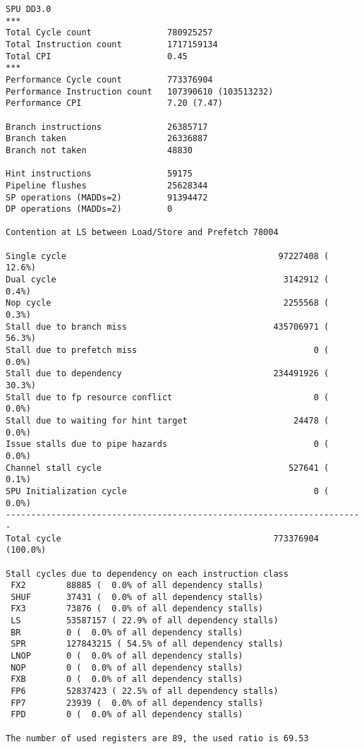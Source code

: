 \scriptsize
\begin{verbatim}
SPU DD3.0
***
Total Cycle count               780925257
Total Instruction count         1717159134
Total CPI                       0.45
***
Performance Cycle count         773376904
Performance Instruction count   107390610 (103513232)
Performance CPI                 7.20 (7.47)

Branch instructions             26385717
Branch taken                    26336887
Branch not taken                48830

Hint instructions               59175
Pipeline flushes                25628344
SP operations (MADDs=2)         91394472
DP operations (MADDs=2)         0

Contention at LS between Load/Store and Prefetch 78004

Single cycle                                          97227408 ( 12.6%)
Dual cycle                                             3142912 (  0.4%)
Nop cycle                                              2255568 (  0.3%)
Stall due to branch miss                             435706971 ( 56.3%)
Stall due to prefetch miss                                   0 (  0.0%)
Stall due to dependency                              234491926 ( 30.3%)
Stall due to fp resource conflict                            0 (  0.0%)
Stall due to waiting for hint target                     24478 (  0.0%)
Issue stalls due to pipe hazards                             0 (  0.0%)
Channel stall cycle                                     527641 (  0.1%)
SPU Initialization cycle                                     0 (  0.0%)
-----------------------------------------------------------------------
Total cycle                                          773376904 (100.0%)

Stall cycles due to dependency on each instruction class
 FX2        88885 (  0.0% of all dependency stalls)
 SHUF       37431 (  0.0% of all dependency stalls)
 FX3        73876 (  0.0% of all dependency stalls)
 LS         53587157 ( 22.9% of all dependency stalls)
 BR         0 (  0.0% of all dependency stalls)
 SPR        127843215 ( 54.5% of all dependency stalls)
 LNOP       0 (  0.0% of all dependency stalls)
 NOP        0 (  0.0% of all dependency stalls)
 FXB        0 (  0.0% of all dependency stalls)
 FP6        52837423 ( 22.5% of all dependency stalls)
 FP7        23939 (  0.0% of all dependency stalls)
 FPD        0 (  0.0% of all dependency stalls)

The number of used registers are 89, the used ratio is 69.53


\end{verbatim}
